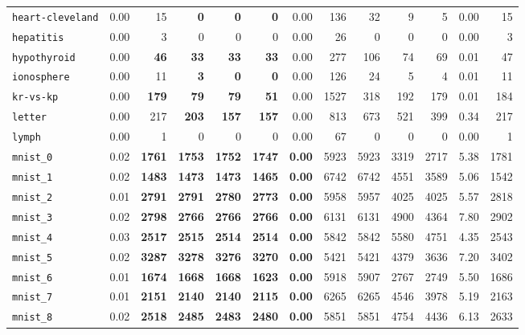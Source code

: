 \begin{tabular}{lrrrrrrrrrrrr}
\texttt{heart-cleveland} & 0.00 & 15 & \textbf{0} & \textbf{0} & \textbf{0} & 0.00 & 136 & 32 & 9 & 5 & 0.00 & 15\\
\texttt{hepatitis} & 0.00 & 3 & 0 & 0 & 0 & 0.00 & 26 & 0 & 0 & 0 & 0.00 & 3\\
\texttt{hypothyroid} & 0.00 & \textbf{46} & \textbf{33} & \textbf{33} & \textbf{33} & 0.00 & 277 & 106 & 74 & 69 & 0.01 & 47\\
\texttt{ionosphere} & 0.00 & 11 & \textbf{3} & \textbf{0} & \textbf{0} & 0.00 & 126 & 24 & 5 & 4 & 0.01 & 11\\
\texttt{kr-vs-kp} & 0.00 & \textbf{179} & \textbf{79} & \textbf{79} & \textbf{51} & 0.00 & 1527 & 318 & 192 & 179 & 0.01 & 184\\
\texttt{letter} & 0.00 & 217 & \textbf{203} & \textbf{157} & \textbf{157} & 0.00 & 813 & 673 & 521 & 399 & 0.34 & 217\\
\texttt{lymph} & 0.00 & 1 & 0 & 0 & 0 & 0.00 & 67 & 0 & 0 & 0 & 0.00 & 1\\
\texttt{mnist\_0} & 0.02 & \textbf{1761} & \textbf{1753} & \textbf{1752} & \textbf{1747} & \textbf{0.00} & 5923 & 5923 & 3319 & 2717 & 5.38 & 1781\\
\texttt{mnist\_1} & 0.02 & \textbf{1483} & \textbf{1473} & \textbf{1473} & \textbf{1465} & \textbf{0.00} & 6742 & 6742 & 4551 & 3589 & 5.06 & 1542\\
\texttt{mnist\_2} & 0.01 & \textbf{2791} & \textbf{2791} & \textbf{2780} & \textbf{2773} & \textbf{0.00} & 5958 & 5957 & 4025 & 4025 & 5.57 & 2818\\
\texttt{mnist\_3} & 0.02 & \textbf{2798} & \textbf{2766} & \textbf{2766} & \textbf{2766} & \textbf{0.00} & 6131 & 6131 & 4900 & 4364 & 7.80 & 2902\\
\texttt{mnist\_4} & 0.03 & \textbf{2517} & \textbf{2515} & \textbf{2514} & \textbf{2514} & \textbf{0.00} & 5842 & 5842 & 5580 & 4751 & 4.35 & 2543\\
\texttt{mnist\_5} & 0.02 & \textbf{3287} & \textbf{3278} & \textbf{3276} & \textbf{3270} & \textbf{0.00} & 5421 & 5421 & 4379 & 3636 & 7.20 & 3402\\
\texttt{mnist\_6} & 0.01 & \textbf{1674} & \textbf{1668} & \textbf{1668} & \textbf{1623} & \textbf{0.00} & 5918 & 5907 & 2767 & 2749 & 5.50 & 1686\\
\texttt{mnist\_7} & 0.01 & \textbf{2151} & \textbf{2140} & \textbf{2140} & \textbf{2115} & \textbf{0.00} & 6265 & 6265 & 4546 & 3978 & 5.19 & 2163\\
\texttt{mnist\_8} & 0.02 & \textbf{2518} & \textbf{2485} & \textbf{2483} & \textbf{2480} & \textbf{0.00} & 5851 & 5851 & 4754 & 4436 & 6.13 & 2633\\

\end{tabular}
